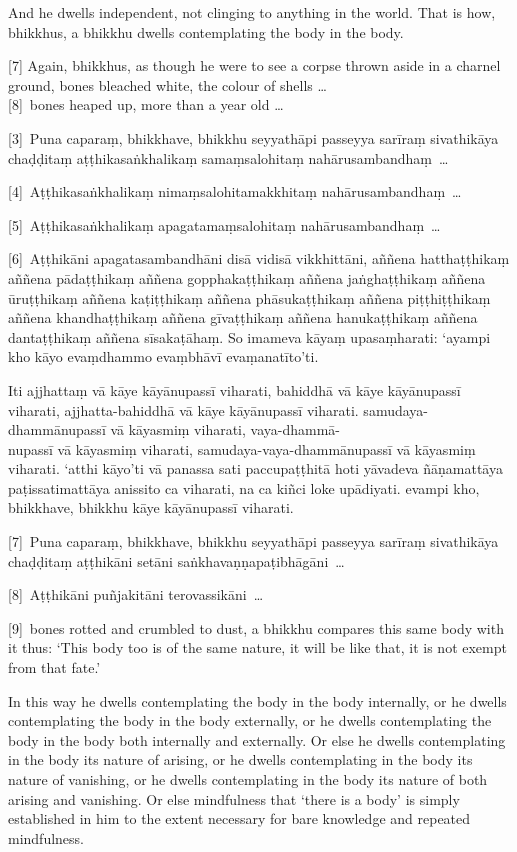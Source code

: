And he dwells independent, not clinging to anything in the world. That is how,
bhikkhus, a bhikkhu dwells contemplating the body in the body.

[7] Again, bhikkhus, as though he were to see a corpse thrown aside in a charnel
ground, bones bleached white, the colour of shells \ldots{}\\
{}[8]~bones heaped up, more than a year old \ldots{}

\paliPage

[3]~Puna caparaṃ, bhikkhave, bhikkhu seyyathāpi passeyya sarīraṃ sivathikāya
chaḍḍitaṃ aṭṭhikasaṅkhalikaṃ samaṃsalohitaṃ nahārusambandhaṃ~\ldots{}

[4]~Aṭṭhikasaṅkhalikaṃ nimaṃsalohitamakkhitaṃ nahārusambandhaṃ~\ldots{}

[5]~Aṭṭhikasaṅkhalikaṃ apagatamaṃsalohitaṃ nahārusambandhaṃ~\ldots{}

[6]~Aṭṭhikāni apagatasambandhāni disā vidisā vikkhittāni, aññena hatthaṭṭhikaṃ
aññena pādaṭṭhikaṃ aññena gopphakaṭṭhikaṃ aññena jaṅghaṭṭhikaṃ aññena ūruṭṭhikaṃ
aññena kaṭiṭṭhikaṃ aññena phāsukaṭṭhikaṃ aññena piṭṭhiṭṭhikaṃ aññena
khandhaṭṭhikaṃ aññena gīvaṭṭhikaṃ aññena hanukaṭṭhikaṃ aññena dantaṭṭhikaṃ
aññena sīsakaṭāhaṃ. So imameva kāyaṃ upasaṃharati: ‘ayampi kho kāyo evaṃdhammo
evaṃbhāvī evaṃanatīto’ti.

Iti ajjhattaṃ vā kāye kāyānupassī viharati, bahiddhā vā kāye kāyānupassī
viharati, ajjhatta-bahiddhā vā kāye kāyānupassī viharati. samudaya-dhammānupassī
vā kāyasmiṃ viharati, vaya-dhammā-\\
nupassī vā kāyasmiṃ viharati, samudaya-vaya-dhammānupassī vā kāyasmiṃ viharati.
‘atthi kāyo’ti vā panassa sati paccupaṭṭhitā hoti yāvadeva ñāṇamattāya
paṭissatimattāya anissito ca viharati, na ca kiñci loke upādiyati. evampi kho,
bhikkhave, bhikkhu kāye kāyānupassī viharati.

[7]~Puna caparaṃ, bhikkhave, bhikkhu seyyathāpi passeyya sarīraṃ sivathikāya
chaḍḍitaṃ aṭṭhikāni setāni saṅkhavaṇṇapaṭibhāgāni~\ldots{}

[8]~Aṭṭhikāni puñjakitāni terovassikāni~\ldots{}

\englishPage

[9]~bones rotted and crumbled to dust, a bhikkhu compares this same
body with it thus: ‘This body too is of the same nature, it will be like that,
it is not exempt from that fate.’

In this way he dwells contemplating the body in the body internally, or he
dwells contemplating the body in the body externally, or he dwells contemplating
the body in the body both internally and externally. Or else he dwells
contemplating in the body its nature of arising, or he dwells contemplating in
the body its nature of vanishing, or he dwells contemplating in the body its
nature of both arising and vanishing. Or else mindfulness that ‘there is a body’
is simply established in him to the extent necessary for bare knowledge and
repeated mindfulness.

